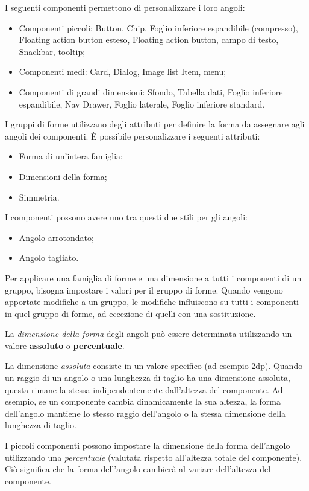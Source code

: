 \documentclass[12pt, a4paper]{report}
\begin{document}
	I seguenti componenti permettono di personalizzare i loro angoli:
	\begin{itemize}
		\item Componenti piccoli: Button, Chip, Foglio inferiore espandibile (compresso), Floating action button esteso, Floating action button, campo di testo, Snackbar, tooltip;
		\item Componenti medi: Card, Dialog, Image list Item, menu;
		\item Componenti di grandi dimensioni: Sfondo, Tabella dati, Foglio inferiore espandibile, Nav Drawer, Foglio laterale, Foglio inferiore standard.
	\end{itemize}
	I gruppi di forme utilizzano degli attributi per definire la forma da assegnare agli angoli dei componenti. È possibile personalizzare i seguenti attributi:
	\begin{itemize}
		\item Forma di un’intera famiglia;
		\item Dimensioni della forma;
		\item Simmetria.
	\end{itemize}
	I componenti possono avere uno tra questi due stili per gli angoli:
	\begin{itemize}
		\item Angolo arrotondato;
		\item Angolo tagliato.
	\end{itemize}
	Per applicare una famiglia di forme e una dimensione a tutti i componenti di un gruppo, bisogna impostare i valori per il gruppo di forme. Quando vengono apportate modifiche a un gruppo, le modifiche influiscono su tutti i componenti in quel gruppo di forme, ad eccezione di quelli con una sostituzione.

	La \textit{dimensione della forma} degli angoli può essere determinata utilizzando un valore \textbf{assoluto} o \textbf{percentuale}.

	La dimensione \textit{assoluta} consiste in un valore specifico (ad esempio 2dp). Quando un raggio di un angolo o una lunghezza di taglio ha una dimensione assoluta, questa rimane la stessa indipendentemente dall'altezza del componente.
	Ad esempio, se un componente cambia dinamicamente la sua altezza, la forma dell'angolo mantiene lo stesso raggio dell'angolo o la stessa dimensione della lunghezza di taglio.

	I piccoli componenti possono impostare la dimensione della forma dell’angolo utilizzando una \textit{percentuale} (valutata rispetto all’altezza totale del componente). Ciò significa che la forma dell'angolo cambierà al variare dell'altezza del componente.
\end{document}
